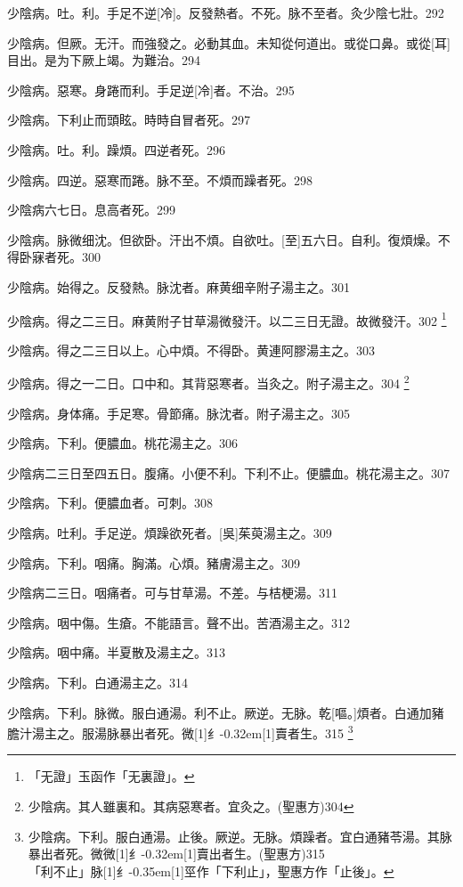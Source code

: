 \documentclass[oneside,b4paper]{ctexbook}
\begin{document}
\begin{flushleft}
少陰病。吐。利。手足不逆[冷]。反發熱者。不死。脉不至者。灸少陰七壯。292

少陰病。但厥。无汗。而強發之。必動其血。未知從何道出。或從口鼻。或從[耳]目出。是为下厥上竭。为難治。294

少陰病。惡寒。身踡而利。手足逆[冷]者。不治。295

少陰病。下利止而頭眩。時時自冒者死。297

少陰病。吐。利。躁煩。四逆者死。296

少陰病。四逆。惡寒而踡。脉不至。不煩而躁者死。298

少陰病六七日。息高者死。299

少陰病。脉微细沈。但欲卧。汗出不煩。自欲吐。[至]五六日。自利。復煩燥。不得卧寐者死。300

少陰病。始得之。反發熱。脉沈者。麻黄细辛附子湯主之。301

少陰病。得之二三日。麻黄附子甘草湯微發汗。以二三日无證。故微發汗。302
\footnote{「无證」玉函作「无裏證」。}

少陰病。得之二三日以上。心中煩。不得卧。黄連阿膠湯主之。303

少陰病。得之一二日。口中和。其背惡寒者。当灸之。附子湯主之。304
\footnote{少陰病。其人雖裏和。其病惡寒者。宜灸之。(聖惠方)304}

少陰病。身体痛。手足寒。骨節痛。脉沈者。附子湯主之。305

少陰病。下利。便膿血。桃花湯主之。306

少陰病二三日至四五日。腹痛。小便不利。下利不止。便膿血。桃花湯主之。307

少陰病。下利。便膿血者。可刺。308

少陰病。吐利。手足逆。煩躁欲死者。[吳]茱萸湯主之。309

少陰病。下利。咽痛。胸滿。心煩。豬膚湯主之。309

少陰病二三日。咽痛者。可与甘草湯。不差。与桔梗湯。311

少陰病。咽中傷。生瘡。不能語言。聲不出。苦酒湯主之。312

少陰病。咽中痛。半夏散及湯主之。313

少陰病。下利。白通湯主之。314

少陰病。下利。脉微。服白通湯。利不止。厥逆。无脉。乾[嘔。]煩者。白通加豬膽汁湯主之。服湯脉暴出者死。微{\hbox{\scalebox{0.6}[1]{纟}\kern-0.32em\scalebox{0.7}[1]{賣}}}者生。315
\footnote{少陰病。下利。服白通湯。止後。厥逆。无脉。煩躁者。宜白通豬苓湯。其脉暴出者死。微微{\hbox{\scalebox{0.6}[1]{纟}\kern-0.32em\scalebox{0.7}[1]{賣}}}出者生。(聖惠方)315\\「利不止」脉{\hbox{\scalebox{0.68}[1]{纟}\kern-0.35em\scalebox{0.64}[1]{巠}}}作「下利止」，聖惠方作「止後」。}


\end{flushleft}
\end{document}
